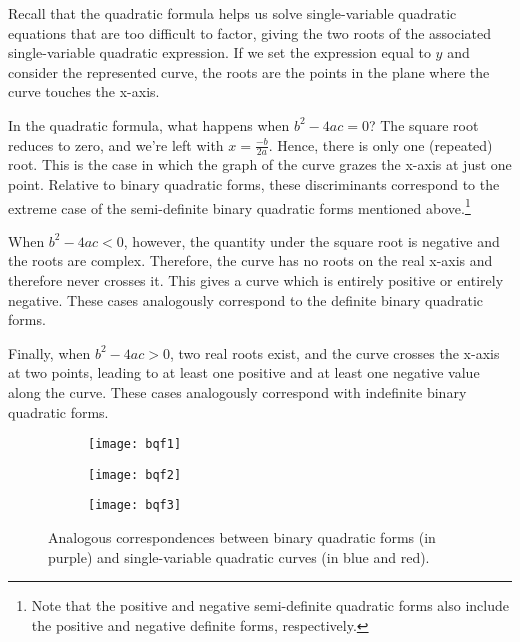 \documentclass{article}
\theoremstyle{definition}
\theoremstyle{theorem}
\theoremstyle{example}
\theoremstyle{corollary}
\begin{document}
\bigskip

Recall that the quadratic formula helps us solve single-variable quadratic equations that are too difficult to factor, giving the two roots of the associated single-variable quadratic expression. If we set the expression equal to \(y\) and consider the represented curve, the roots are the points in the plane where the curve touches the x-axis.

\bigskip

In the quadratic formula, what happens when \(b^{2} - 4ac = 0\)? The square root reduces to zero, and we're left with \(x = \frac{-b}{2a}\). Hence, there is only one (repeated) root. This is the case in which the graph of the curve grazes the x-axis at just one point. Relative to binary quadratic forms, these discriminants correspond to the extreme case of the semi-definite binary quadratic forms mentioned above.\footnote{Note that the positive and negative semi-definite quadratic forms also include the positive and negative definite forms, respectively.}

\bigskip

When \(b^{2} - 4ac < 0\), however, the quantity under the square root is negative and the roots are complex. Therefore, the curve has no roots on the real x-axis and therefore never crosses it. This gives a curve which is entirely positive or entirely negative. These cases analogously correspond to the definite binary quadratic forms.

\bigskip

Finally, when \(b^{2} - 4ac > 0\), two real roots exist, and the curve crosses the x-axis at two points, leading to at least one positive and at least one negative value along the curve. These cases analogously correspond with indefinite binary quadratic forms.

\bigskip

\begin{figure}[H]
    \centering
    \begin{subfigure}
        \centering
        \texttt{[image: bqf1]}
    \end{subfigure}
    \begin{subfigure}
        \centering
        \texttt{[image: bqf2]}
    \end{subfigure}
    \begin{subfigure}
        \centering
        \texttt{[image: bqf3]}
    \end{subfigure}    
    \caption{Analogous correspondences between binary quadratic forms (in purple) and single-variable quadratic curves (in blue and red).}
\end{figure}
\end{document}
